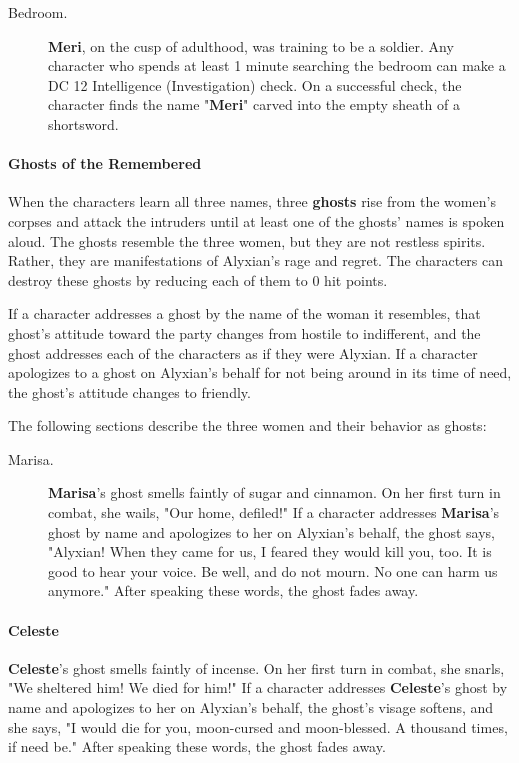 \documentclass[letterpaper, 11pt, bg=full, twocolumn]{dndbook}
\begin{document}
\begin{description}
\item[Bedroom.] \textbf{Meri}, on the cusp of adulthood, was training to be a soldier. Any character who spends at least 1 minute searching the bedroom can make a DC 12 Intelligence (Investigation) check. On a successful check, the character finds the name "\textbf{Meri}" carved into the empty sheath of a shortsword.
\end{description}

\paragraph{Ghosts of the Remembered}

When the characters learn all three names, three \textbf{ghosts} rise from the women's corpses and attack the intruders until at least one of the ghosts' names is spoken aloud. The ghosts resemble the three women, but they are not restless spirits. Rather, they are manifestations of Alyxian's rage and regret. The characters can destroy these ghosts by reducing each of them to 0 hit points.

If a character addresses a ghost by the name of the woman it resembles, that ghost's attitude toward the party changes from hostile to indifferent, and the ghost addresses each of the characters as if they were Alyxian. If a character apologizes to a ghost on Alyxian's behalf for not being around in its time of need, the ghost's attitude changes to friendly.

The following sections describe the three women and their behavior as ghosts:

\begin{description}
\item[Marisa.] \textbf{Marisa}'s ghost smells faintly of sugar and cinnamon. On her first turn in combat, she wails, "Our home, defiled!" If a character addresses \textbf{Marisa}'s ghost by name and apologizes to her on Alyxian's behalf, the ghost says, "Alyxian! When they came for us, I feared they would kill you, too. It is good to hear your voice. Be well, and do not mourn. No one can harm us anymore." After speaking these words, the ghost fades away.
\end{description}

\paragraph{Celeste}

\textbf{Celeste}'s ghost smells faintly of incense. On her first turn in combat, she snarls, "We sheltered him! We died for him!" If a character addresses \textbf{Celeste}'s ghost by name and apologizes to her on Alyxian's behalf, the ghost's visage softens, and she says, "I would die for you, moon-cursed and moon-blessed. A thousand times, if need be." After speaking these words, the ghost fades away.
\end{document}
